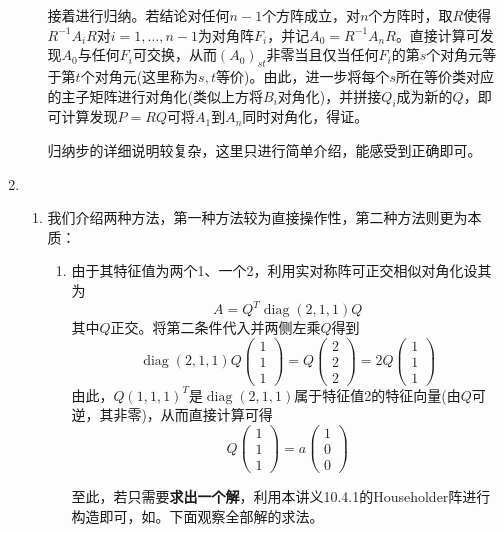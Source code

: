 \documentclass[a4paper,UTF8,fontset=windows]{ctexart}
\DeclareMathOperator{\diag}{diag}
\newcommand*{\note}{\noindent *}
\begin{document}
\begin{enumerate}
\begin{enumerate}
        接着进行归纳。若结论对任何$n-1$个方阵成立，对$n$个方阵时，取$R$使得$R^{-1}A_iR$对$i=1,\dots,n-1$为对角阵$F_i$，并记$A_0=R^{-1}A_nR$。直接计算可发现$A_0$与任何$F_i$可交换，从而$(A_0)_{st}$非零当且仅当任何$F_i$的第$s$个对角元等于第$t$个对角元(这里称为$s,t$等价)。由此，进一步将每个$s$所在等价类对应的主子矩阵进行对角化(类似上方将$B_i$对角化)，并拼接$Q_i$成为新的$Q$，即可计算发现$P=RQ$可将$A_1$到$A_n$同时对角化，得证。

        \note 归纳步的详细说明较复杂，这里只进行简单介绍，能感受到正确即可。
    \end{enumerate}
    
    \item
    \begin{enumerate}
        \item 
        我们介绍两种方法，第一种方法较为直接操作性，第二种方法则更为本质：
        \begin{enumerate}
            \item         由于其特征值为两个1、一个2，利用实对称阵可正交相似对角化设其为
            $$A=Q^T\diag(2,1,1)Q$$
            其中$Q$正交。将第二条件代入并两侧左乘$Q$得到
            $$\diag(2,1,1)Q\begin{pmatrix}1\\1\\1\end{pmatrix}=Q\begin{pmatrix}2\\2\\2\end{pmatrix}=2Q\begin{pmatrix}1\\1\\1\end{pmatrix}$$
            由此，$Q(1,1,1)^T$是$\diag(2,1,1)$属于特征值2的特征向量(由$Q$可逆，其非零)，从而直接计算可得
            $$Q\begin{pmatrix}1\\1\\1\end{pmatrix}=a\begin{pmatrix}1\\0\\0\end{pmatrix}$$
    
            \note 至此，若只需要\textbf{求出一个解}，利用本讲义10.4.1的Householder阵进行构造即可，如。下面观察全部解的求法。
    

\end{enumerate}
\end{enumerate}
\end{enumerate}
\end{document}
